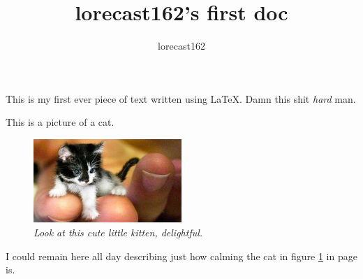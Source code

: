 \documentclass[8pt, a4paper]{article}
\title{lorecast162's first doc}
\author{lorecast162}
\begin{document}
\maketitle
This is my first ever piece of text written using LaTeX.
Damn this shit \textit{hard} man.

This is a picture of a cat.
\begin{figure}[h]
  \centering
  \includegraphics[width=0.5\textwidth]{cat}
  \caption{\emph{Look at this cute little kitten, delightful.}}
  \label{fig:catto}
\end{figure}

I could remain here all day describing just
how calming the cat in figure \ref{fig:catto}
in page \pageref{fig:catto} is.
\end{document}
